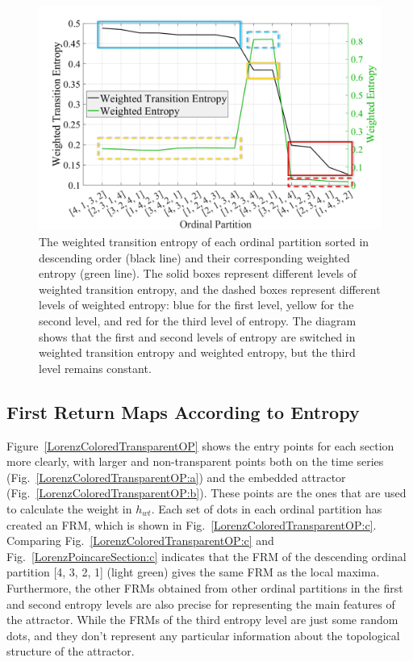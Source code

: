 \documentclass[%
 aip,
 amsmath,amssymb,
 reprint,%
]{revtex4-1}
\begin{document}
\begin{figure}[htbp]
\centerline{\includegraphics[width=\linewidth]{SortedEntropy.png}}
\caption{The weighted transition entropy of each ordinal partition sorted in descending order (black line) and their corresponding weighted entropy (green line). The solid boxes represent different levels of weighted transition entropy, and the dashed boxes represent different levels of weighted entropy: blue for the first level, yellow for the second level, and red for the third level of entropy. The diagram shows that the first and second levels of entropy are switched in weighted transition entropy and weighted entropy, but the third level remains constant.}
\label{SortedEntropy}
\end{figure}

\subsection{\label{sec:First Return Maps According to Entropy}First Return Maps According to Entropy}

Figure~\ref{LorenzColoredTransparentOP} shows the entry points for each section more clearly, with larger and non-transparent points both on the time series (Fig.~\ref{LorenzColoredTransparentOP:a}) and the embedded attractor (Fig.~\ref{LorenzColoredTransparentOP:b}). These points are the ones that are used to calculate the weight in $h_{wt}$. Each set of dots in each ordinal partition has created an FRM, which is shown in Fig.~\ref{LorenzColoredTransparentOP:c}. Comparing Fig.~\ref{LorenzColoredTransparentOP:c} and Fig.~\ref{LorenzPoincareSection:c} indicates that the FRM of the descending ordinal partition [4, 3, 2, 1] (light green) gives the same FRM as the local maxima. Furthermore, the other FRMs obtained from other ordinal partitions in the first and second entropy levels are also precise for representing the main features of the attractor. While the FRMs of the third entropy level are just some random dots, and they don't represent any particular information about the topological structure of the attractor.
\end{document}
